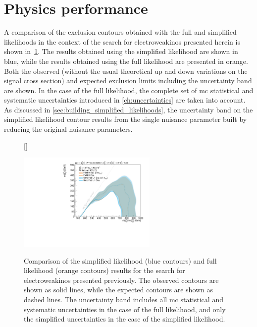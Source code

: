 \section{Physics performance}\label{sec:physics_performance}

A comparison of the exclusion contours obtained with the full and simplified likelihoods in the context of the search for electroweakinos presented herein is shown in~\cref{fig:results_simplify_1Lbb}. The results obtained using the simplified likelihood are shown in blue, while the results obtained using the full likelihood are presented in orange. Both the observed (without the usual theoretical up and down variations on the signal cross section) and expected exclusion limits including the uncertainty band are shown. In the case of the full likelihood, the complete set of \gls{mc} statistical and systematic uncertainties introduced in \cref{ch:uncertainties} are taken into account. As discussed in \cref{sec:building_simplified_likelihoods}, the uncertainty band on the simplified likelihood contour results from the single nuisance parameter built by reducing the original nuisance parameters.

\begin{figure}
[\FBwidth]
{\caption{Comparison of the simplified likelihood (blue contours) and full likelihood (orange contours) results for the search for electroweakinos presented previously. The observed contours are shown as solid lines, while the expected contours are shown as dashed lines. The uncertainty band includes all \gls{mc} statistical and systematic uncertainties in the case of the full likelihood, and only the simplified uncertainties in the case of the simplified likelihood.}\label{fig:results_simplify_1Lbb}}
{\includegraphics[width=0.60\textwidth]{exclusion_1Lbb_noLabel}}
\end{figure}


